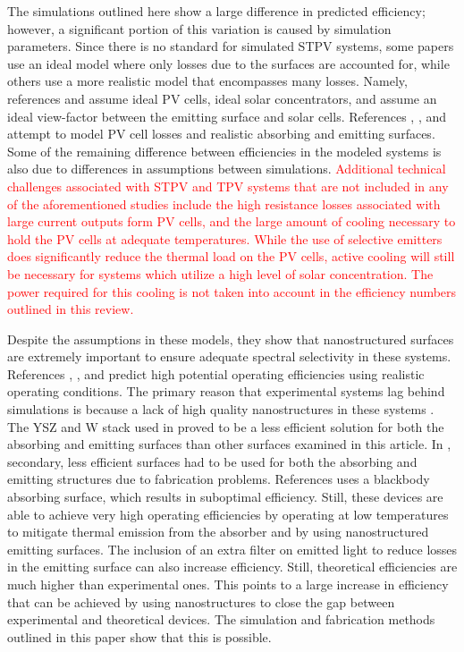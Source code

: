 \documentclass[review]{elsarticle}
\begin{document}
The simulations outlined here show a large difference in predicted efficiency; however, a significant portion of this variation is caused by simulation parameters.  Since there is no standard for simulated STPV systems, some papers use an ideal model where only losses due to the surfaces are accounted for, while others use a more realistic model that encompasses many losses.  Namely, references \cite{RF_OptExp_2009} and \cite{global_opt} assume ideal PV cells, ideal solar concentrators, and assume an ideal view-factor between the emitting surface and solar cells.  References \cite{paper2_ref6}, \cite{me_thesis}, and \cite{NYL_SEMSC_2014} attempt to model PV cell losses and realistic absorbing and emitting surfaces.  Some of the remaining difference between efficiencies in the modeled systems is also due to differences in assumptions between simulations.  \textcolor{red}{Additional technical challenges associated with STPV and TPV systems that are not included in any of the aforementioned studies include the high resistance losses associated with large current outputs form PV cells, and the large amount of cooling necessary to hold the PV cells at adequate temperatures.  While the use of selective emitters does significantly reduce the thermal load on the PV cells, active cooling will still be necessary for systems which utilize a high level of solar concentration.  The power required for this cooling is not taken into account in the efficiency numbers outlined in this review.}

Despite the assumptions in these models, they show that nanostructured surfaces are extremely important to ensure adequate spectral selectivity in these systems.  References \cite{paper2_ref6}, \cite{me_thesis}, and \cite{NYL_SEMSC_2014} predict high potential operating efficiencies using realistic operating conditions.  The primary reason that experimental systems lag behind simulations is because a lack of high quality nanostructures in these systems \cite{SKY_JPE_2015,me3}.  The YSZ and W stack used in \cite{SKY_JPE_2015} proved to be a less efficient solution for both the absorbing and emitting surfaces than other surfaces examined in this article.  In \cite{me3}, secondary, less efficient surfaces had to be used for both the absorbing and emitting structures due to fabrication problems. References \cite{SKY_JPE_2015,MIT_paper,nnnNature} uses a blackbody absorbing surface, which results in suboptimal efficiency.  Still, these devices are able to achieve very high operating efficiencies by operating at low temperatures to mitigate thermal emission from the absorber and by using nanostructured emitting surfaces.  The inclusion of an extra filter on emitted light to reduce losses in the emitting surface can also increase efficiency\cite{nnnNature}.  Still, theoretical efficiencies are much higher than experimental ones. This points to a large increase in efficiency that can be achieved by using nanostructures to close the gap between experimental and theoretical devices.  The simulation and fabrication methods outlined in this paper show that this is possible.
\end{document}
